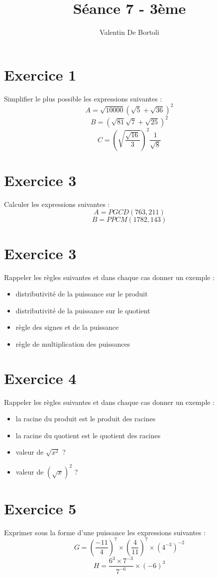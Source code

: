 \documentclass[10pt,a4paper]{article}
\title{Séance 7 - 3ème}
\author{Valentin De Bortoli}
\begin{document}
\maketitle
\section{Exercice 1}
Simplifier le plus possible les expressions suivantes :
\begin{equation}
A=\sqrt{10000}(\sqrt{5}+\sqrt{36})^2
\end{equation}
\begin{equation}
B=(\sqrt{81}\sqrt{7} +\sqrt{25})^2
\end{equation}
\begin{equation}
C=\left( \sqrt{\frac{\sqrt{16}}{3}} \right)^2 \frac{1}{\sqrt{8}}
\end{equation}
\section{Exercice 3}
Calculer les expressions suivantes :
\begin{equation}
A=PGCD(763,211)
\end{equation}
\begin{equation}
B=PPCM(1782,143)
\end{equation}
\section{Exercice 3}
Rappeler les règles suivantes et dans chaque cas donner un exemple :
\begin{itemize}
\item distributivité de la puissance sur le produit
\item distributivité de la puissance sur le quotient
\item règle des signes et de la puissance
\item règle  de multiplication des puissances
\end{itemize}
\section{Exercice 4}
Rappeler les règles suivantes et dans chaque cas donner un exemple :
\begin{itemize}
\item la racine du produit est le produit des racines
\item la racine du quotient est le quotient des racines
\item valeur de $\sqrt{x^2}$ ?
\item valeur de $\left( \sqrt{x} \right)^2$ ?
\end{itemize}
\section{Exercice 5}
Exprimer sous la forme d'une puissance les expressions suivantes :
\begin{equation}
G=\left( \frac{-11}{4} \right)^7 \times \left( \frac{4}{11} \right)^7 \times (4^{-3})^{-2}
\end{equation}
\begin{equation}
H=\frac{6^3 \times 7^{-3}}{7^{-6}}\times (-6)^3
\end{equation}
\end{document}
